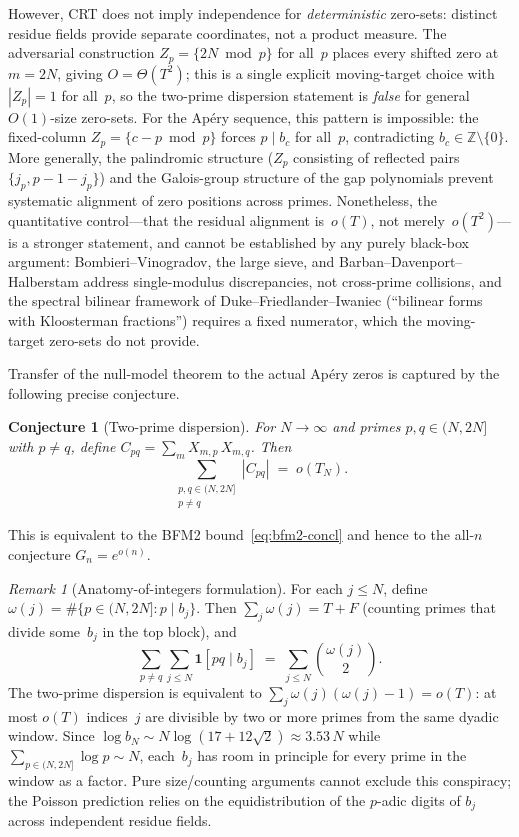 \documentclass[11pt]{article}
\newtheorem{conjecture}[theorem]{Conjecture}
\theoremstyle{definition}
\theoremstyle{remark}
\newtheorem{remark}[theorem]{Remark}
\begin{document}
However, CRT does not imply
independence for \emph{deterministic}
zero-sets: distinct residue fields
provide separate coordinates,
not a product measure.
The adversarial construction
$Z_p = \{2N \bmod p\}$ for all~$p$
places every shifted zero at $m = 2N$,
giving $O = \Theta(T^2)$; this is a single
explicit moving-target choice with
$|Z_p| = 1$ for all~$p$, so the
two-prime dispersion statement is
\emph{false} for general~$O(1)$-size
zero-sets.
For the Ap\'ery sequence, this
pattern is impossible: the fixed-column
$Z_p = \{c - p \bmod p\}$ forces
$p \mid b_c$ for all~$p$, contradicting
$b_c \in \mathbb{Z} \setminus \{0\}$.
More generally, the palindromic
structure ($Z_p$ consisting of
reflected pairs
$\{j_p, p{-}1{-}j_p\}$) and the
Galois-group structure of the gap
polynomials prevent systematic
alignment of zero positions across primes.
Nonetheless, the quantitative
control---that the residual alignment
is~$o(T)$, not merely~$o(T^2)$---is a
stronger statement, and cannot be
established by any purely black-box
argument: Bombieri--Vinogradov, the
large sieve, and Barban--Davenport--Halberstam
address single-modulus
discrepancies, not cross-prime collisions,
and the spectral bilinear framework of
Duke--Friedlander--Iwaniec (``bilinear forms
with Kloosterman fractions'') requires
a fixed numerator, which the moving-target
zero-sets do not provide.

Transfer of the null-model theorem
to the actual Ap\'ery zeros
is captured by the following
precise conjecture.

\begin{conjecture}[Two-prime dispersion]
\label{conj:two-prime}
For $N \to \infty$ and primes
$p, q \in (N, 2N]$ with
$p \ne q$, define
$C_{pq} = \sum_m X_{m,p}\,X_{m,q}$.
Then
\[
\sum_{\substack{p,q \in (N,2N] \\
p \ne q}} |C_{pq}|
\;=\; o(T_N).
\]
\end{conjecture}

\noindent
This is equivalent to
the BFM2 bound~\eqref{eq:bfm2-concl}
and hence to the all-$n$
conjecture $G_n = e^{o(n)}$.

\begin{remark}[Anatomy-of-integers formulation]
\label{rem:anatomy}
For each $j \le N$, define
$\omega(j) = \#\{p \in (N, 2N] : p \mid b_j\}$.
Then $\sum_j \omega(j) = T + F$
(counting primes that divide some~$b_j$
in the top block), and
\[
\sum_{p \ne q} \!\sum_{j \le N}\!
\mathbf{1}[pq \mid b_j]
\;=\; \sum_{j \le N} \binom{\omega(j)}{2}.
\]
The two-prime dispersion is equivalent
to $\sum_j \omega(j)(\omega(j){-}1) = o(T)$:
at most $o(T)$ indices~$j$ are
divisible by two or more primes
from the same dyadic window.
Since $\log b_N \sim N\log(17 + 12\sqrt{2})
\approx 3.53\,N$ while
$\sum_{p \in (N,2N]} \log p \sim N$,
each~$b_j$ has room in principle
for every prime in the window as a factor.
Pure size/counting arguments cannot
exclude this conspiracy; the Poisson
prediction relies on the equidistribution
of the $p$-adic digits of $b_j$
across independent residue fields.
\end{remark}
\end{document}
